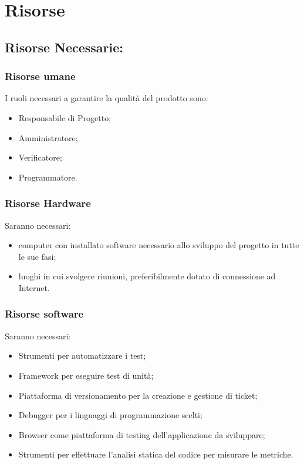 \section{Risorse}
\subsection{Risorse Necessarie:}

\subsubsection{Risorse umane}

I ruoli necessari a garantire la qualità del prodotto sono:
\begin{itemize}
	\item Responsabile di Progetto;
	\item Amministratore;
	\item Verificatore;
	\item Programmatore. 
\end{itemize}

\subsubsection{Risorse Hardware}

Saranno necessari:
\begin{itemize}
	\item computer con installato software necessario allo sviluppo del progetto in tutte le sue fasi;
	\item luoghi in cui svolgere riunioni, preferibilmente dotato di connessione ad Internet.
\end{itemize}

\subsubsection{Risorse software}

Saranno necessari:
\begin{itemize}
	\item Strumenti per automatizzare i test;
	\item Framework per eseguire test di unità;
	\item Piattaforma di versionamento per la creazione e gestione di ticket;
	\item Debugger per i linguaggi di programmazione scelti;
	\item Browser come piattaforma di testing dell'applicazione da sviluppare;
	\item Strumenti per effettuare l'analisi statica del codice per misurare le metriche.
\end{itemize}

